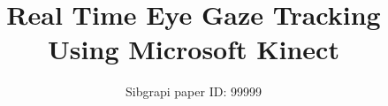 \documentclass[10pt, conference]{IEEEtran}
\begin{document}
%
\title{Real Time Eye Gaze Tracking Using Microsoft Kinect}

\newif\iffinal
\finalfalse
\newcommand{\jemsid}{99999}


\iffinal
  \author{%
    \IEEEauthorblockN{Raul Benites Paradeda}
    \IEEEauthorblockA{%
      INESC-ID \& Instituto Superior T\'{e}cnico\\
      University of Lisbon\\
      Lisbon, Portugal\\
      Email: \href{mailto:raul.paradeda@tecnico.ulisboa.pt}{raul.paradeda@tecnico.ulisboa.pt}}
  \and
    \IEEEauthorblockN{Jones Granatyr, Jean Paul Barddal}
    \IEEEauthorblockA{%
      Graduate Program in Informatics (PPGIa)\\
      Pontif\'{i}cia Universidade Cat\'{o}lica do Paran\'{a} (PUCPR)\\
      Curitiba, Brazil\\
      Email:  \href{mailto:jones.granatyr@pucpr.edu.br}{jones.granatyr@pucpr.edu.br}, \href{mailto:jean.barddal@ppgia.pucpr.br}{jean.barddal@ppgia.pucpr.br}}
   \and
    \IEEEauthorblockN{Alberto Signoretti}
    \IEEEauthorblockA{%
      Graduate Program in Computer Science \\
      State Universtity of Rio Grande do Norte (UERN)\\
      Natal, Brazil\\
      Email:  \href{mailto:albertosignoretti@uern.br}{albertosignoretti@uern.br}}
  }
\else
  \author{Sibgrapi paper ID: \jemsid \\ }
\fi

\maketitle
\end{document}
